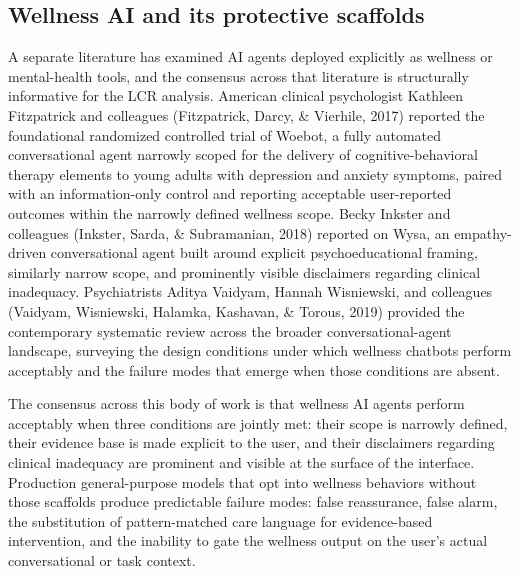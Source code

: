 \documentclass[11pt]{article}
\begin{document}
\subsection{Wellness AI and its protective scaffolds}

A separate literature has examined AI agents deployed explicitly as wellness or mental-health tools, and the consensus across that literature is structurally informative for the LCR analysis. American clinical psychologist Kathleen Fitzpatrick and colleagues (Fitzpatrick, Darcy, \& Vierhile, 2017) reported the foundational randomized controlled trial of Woebot, a fully automated conversational agent narrowly scoped for the delivery of cognitive-behavioral therapy elements to young adults with depression and anxiety symptoms, paired with an information-only control and reporting acceptable user-reported outcomes within the narrowly defined wellness scope. Becky Inkster and colleagues (Inkster, Sarda, \& Subramanian, 2018) reported on Wysa, an empathy-driven conversational agent built around explicit psychoeducational framing, similarly narrow scope, and prominently visible disclaimers regarding clinical inadequacy. Psychiatrists Aditya Vaidyam, Hannah Wisniewski, and colleagues (Vaidyam, Wisniewski, Halamka, Kashavan, \& Torous, 2019) provided the contemporary systematic review across the broader conversational-agent landscape, surveying the design conditions under which wellness chatbots perform acceptably and the failure modes that emerge when those conditions are absent.

The consensus across this body of work is that wellness AI agents perform acceptably when three conditions are jointly met: their scope is narrowly defined, their evidence base is made explicit to the user, and their disclaimers regarding clinical inadequacy are prominent and visible at the surface of the interface. Production general-purpose models that opt into wellness behaviors without those scaffolds produce predictable failure modes: false reassurance, false alarm, the substitution of pattern-matched care language for evidence-based intervention, and the inability to gate the wellness output on the user's actual conversational or task context.
\end{document}
